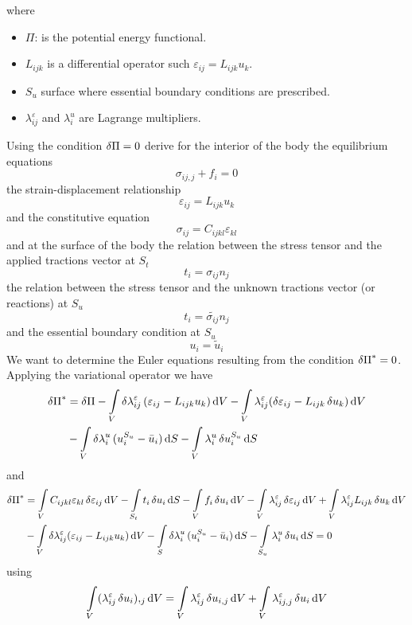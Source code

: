where
\begin{itemize}
\item $\Pi$: is the potential energy functional.
\item $L_{ijk}$ is a differential operator such $\varepsilon_{ij} = L_{ijk} u_k$.
\item $S_u$ surface where essential boundary conditions are prescribed.
\item $\lambda_{ij}^\varepsilon $ and $\lambda_i^u$ are Lagrange multipliers.
\end{itemize}

Using the condition $\var{\Pi} = 0$ derive for the interior of the body the equilibrium equations
\[\sigma_{ij,j} + f_i = 0\]
the strain-displacement relationship
\[\varepsilon_{ij} = L_{ijk} u_k\]
and the constitutive equation
\[\sigma_{ij} = C_{ijkl} \varepsilon_{kl}\]
and at the surface of the body the relation between the stress tensor and the applied tractions vector at $S_t$
\[t_i = \sigma_{ij} n_j\]
the relation between the stress tensor and the unknown tractions vector (or reactions) at $S_u$
\[t_i = \tilde{\sigma_{ij}} n_j\]
and the essential boundary condition at $S_u$
\[u_i = \tilde{u}_i\]
We want to determine the Euler equations resulting from the condition $\var{\Pi}^* = 0$. Applying the variational operator we have
\begin{equation}
\begin{aligned}
\var{\Pi}^*& = \var{\Pi}  - \int\limits_V \var{\lambda}_{ij}^{\varepsilon}  (\varepsilon_{ij} - L_{ijk} u_k)\dd{V}- \int\limits_V \lambda_{ij}^\varepsilon (\var{\varepsilon}_{ij} - L_{ijk}\var{u}_k)\dd{V} \\
&-\int\limits_V \var{\lambda}_i^u (u_i^{S_u} - \bar u_i)\dd{S} - \int\limits_V \lambda _i^u \var{u}_i^{S_u} \dd{S}
\end{aligned}
\end{equation}
and
\begin{equation}
\begin{aligned}
\var{\Pi}^* &= \int\limits_V C_{ijkl} \varepsilon_{kl} \var{ \varepsilon}_{ij}\dd{V} - \int\limits_{S_t} t_i \var{u_i} \dd{S}  - \int\limits_V f_i \var{u_i}\dd{V} - \int\limits_V \lambda_{ij}^{\varepsilon} \var{\varepsilon}_{ij}\dd{V}  + \int\limits_V \lambda_{ij}^{\varepsilon} L_{ijk}\var{u_k}\dd{V}\\
&- \int\limits_V \delta \lambda_{ij}^\varepsilon (\varepsilon_{ij} - L_{ijk} u_k)\dd{V} - \int\limits_S \var{\lambda}_i^u (u_i^{S_u} - \bar {u}_i)\dd{S} - \int\limits_{S_u} \lambda _i^u\var{u_i}\dd{S} = 0
\end{aligned}
\end{equation}
using
\[\int\limits_V (\lambda_{ij}^\varepsilon \var{u_i}){,_j}\dd{V} =  \int\limits_V \lambda_{ij}^\varepsilon \var{u}_{i,j}\dd{V}  + \int\limits_V \lambda_{ij,j}^\varepsilon \var{u_i}\dd{V} \]

